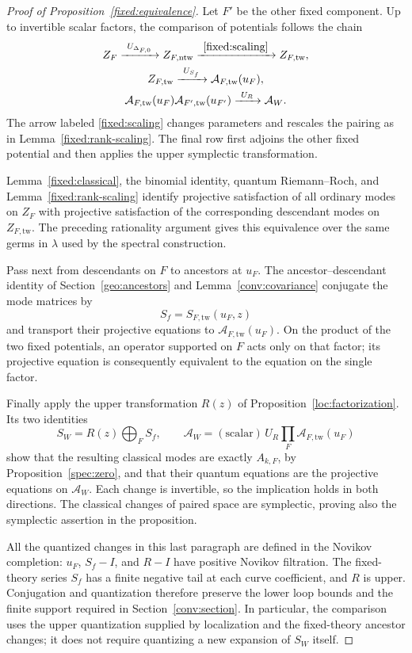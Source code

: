 \begin{proof}[Proof of Proposition~\ref{fixed:equivalence}]
Let $F'$ be the other fixed component.  Up to invertible scalar factors,
the comparison of potentials follows the chain
\[
\begin{gathered}
 Z_F\xrightarrow{\ U_{\Delta_{F,0}}\ }Z_{F,\mathrm{ntw}}
       \xrightarrow{\ \eqref{fixed:scaling}\ }Z_{F,\mathrm{tw}},
 \\
 Z_{F,\mathrm{tw}}\xrightarrow{\ U_{S_f}\ }
       \mathcal A_{F,\mathrm{tw}}(u_F),
 \\
 \mathcal A_{F,\mathrm{tw}}(u_F)
 \mathcal A_{F',\mathrm{tw}}(u_{F'})
       \xrightarrow{\ U_R\ }\mathcal A_W.
\end{gathered}
\]
The arrow labeled \eqref{fixed:scaling} changes parameters and rescales
the pairing as in Lemma~\ref{fixed:rank-scaling}.  The final row first
adjoins the other fixed potential and then applies the upper symplectic
transformation.

Lemma~\ref{fixed:classical}, the binomial identity, quantum
Riemann--Roch, and Lemma~\ref{fixed:rank-scaling} identify projective
satisfaction of all ordinary modes on $Z_F$ with projective
satisfaction of the corresponding descendant modes on
$Z_{F,\mathrm{tw}}$.  The preceding rationality argument gives this
equivalence over the same germs in $\lambda$ used by the spectral
construction.

Pass next from descendants on $F$ to ancestors at $u_F$.  The
ancestor--descendant identity of Section~\ref{geo:ancestors} and
Lemma~\ref{conv:covariance} conjugate the mode matrices by
\[
 S_f=S_{F,\mathrm{tw}}(u_F,z)
\]
and transport their projective equations to
$\mathcal A_{F,\mathrm{tw}}(u_F)$.  On the product of the two fixed
potentials, an operator supported on $F$ acts only on that factor; its
projective equation is consequently equivalent to the equation on
the single factor.

Finally apply the upper transformation $R(z)$ of
Proposition~\ref{loc:factorization}.  Its two identities
\[
 S_W=R(z)\bigoplus_F S_f,
 \qquad
 \mathcal A_W=(\text{scalar})\,
      U_R\prod_F\mathcal A_{F,\mathrm{tw}}(u_F)
\]
show that the resulting classical modes are exactly $A_{k,F}$, by
Proposition~\ref{spec:zero}, and that their quantum equations are the
projective equations on $\mathcal A_W$.  Each change is invertible, so
the implication holds in both directions.  The classical changes of
paired space are symplectic, proving also the symplectic assertion in
the proposition.

All the quantized changes in this last paragraph are defined in the
Novikov completion: $u_F$, $S_f-I$, and $R-I$ have positive Novikov
filtration.  The fixed-theory series $S_f$ has a finite negative tail
at each curve coefficient, and $R$ is upper.  Conjugation and
quantization therefore preserve the lower loop bounds and the finite
support required in Section~\ref{conv:section}.  In particular, the
comparison uses the upper quantization supplied by localization and
the fixed-theory ancestor changes; it does not require quantizing a
new expansion of $S_W$ itself.
\end{proof}
